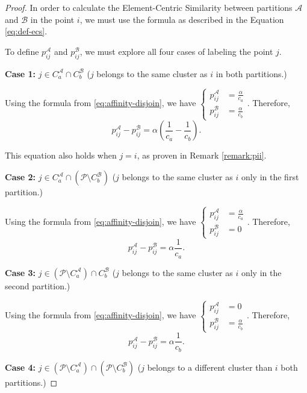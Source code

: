 \begin{proof}
   In order to calculate the Element-Centric Similarity between partitions $\mathcal{A}$ and $\mathcal{B}$ in the point $i$, we must use the formula as described in the Equation \ref{eq:def-ecs}.

   To define $p_{ij}^{\mathcal{A}}$ and $p_{ij}^{\mathcal{B}}$, we must explore all four cases of labeling the point $j$. 
    
   \textbf{Case 1:} $j \in C_a^{\mathcal{A}} \cap C_b^{\mathcal{B}}$ ($j$ belongs to the same cluster as $i$ in both partitions.)

   Using the formula from \ref{eq:affinity-disjoin}, we have $\displaystyle
    \begin{cases}
        p_{ij}^\mathcal{A} &= \frac{\alpha}{c_a} \\
        p_{ij}^\mathcal{B} &= \frac{\alpha}{c_b} 
    \end{cases}$. Therefore, 
    \[ p_{ij}^\mathcal{A} - p_{ij}^\mathcal{B} = \alpha \left(\frac{1}{c_a} - \frac{1}{c_b}\right) .\]

    This equation also holds when $j = i$, as proven in Remark \ref{remark:pii}.

    \textbf{Case 2:} $j \in C_a^\mathcal{A} \cap (\mathcal{P} \setminus C_b^{\mathcal{B}})$ ($j$ belongs to the same cluster as $i$ only in the first partition.)

   Using the formula from \ref{eq:affinity-disjoin}, we have $\displaystyle
    \begin{cases}
        p_{ij}^\mathcal{A} &= \frac{\alpha}{c_a} \\
        p_{ij}^\mathcal{B} &= 0
    \end{cases}$. Therefore, 
    \[ p_{ij}^\mathcal{A} - p_{ij}^\mathcal{B} = \alpha \frac{1}{c_a} .\]

    \textbf{Case 3:} $j \in (\mathcal{P} \setminus C_a^\mathcal{A}) \cap  C_b^{\mathcal{B}}$ ($j$ belongs to the same cluster as $i$ only in the second partition.)

   Using the formula from \ref{eq:affinity-disjoin}, we have $\displaystyle
    \begin{cases}
        p_{ij}^\mathcal{A} &= 0 \\
        p_{ij}^\mathcal{B} &=\frac{\alpha}{c_b}
    \end{cases}$. Therefore, 
    \[ p_{ij}^\mathcal{A} - p_{ij}^\mathcal{B} = \alpha \frac{1}{c_b} .\]

    \textbf{Case 4:} $j \in (\mathcal{P} \setminus C_a^\mathcal{A}) \cap  (\mathcal{P} \setminus C_b^{\mathcal{B}})$ ($j$ belongs to a different cluster than $i$ both partitions.)


\end{proof}
